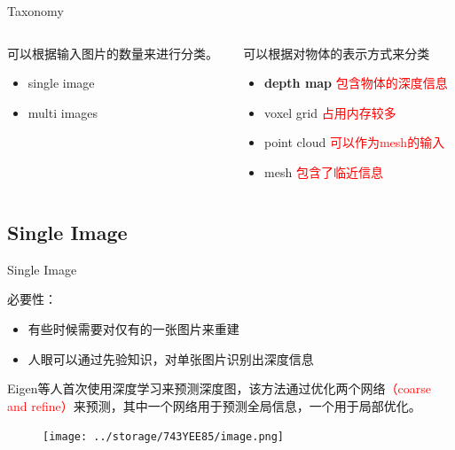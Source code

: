 \documentclass[dark]{sintefbeamer}
\begin{document}
\begin{frame}[fragile]{Taxonomy}
  \begin{columns}
    \begin{column}{0.5\textwidth}
      可以根据输入图片的数量来进行分类。
      \begin{itemize}
        \item single image
        \item multi images
      \end{itemize}
  
    \end{column}
    \begin{column}{0.5\textwidth}
      可以根据对物体的表示方式来分类
      \begin{itemize}
        \item \textbf{depth map} \quad \textcolor{red}{包含物体的深度信息}
        \item voxel grid \quad \textcolor{red}{占用内存较多}
        \item point cloud \quad \textcolor{red}{可以作为mesh的输入}
        \item mesh \quad \textcolor{red}{包含了临近信息}
      \end{itemize}
    \end{column}
  \end{columns}
\end{frame}


\subsection{Single Image}


\begin{frame}[t, fragile]{Single Image}
  
  必要性：
  \begin{itemize}
    \item 有些时候需要对仅有的一张图片来重建
    \item 人眼可以通过先验知识，对单张图片识别出深度信息
  \end{itemize}

  Eigen\cite{eigenDepthMapPrediction}等人首次使用深度学习来预测深度图，该方法通过优化两个网络\textcolor{red}{（coarse and refine）}来预测，其中一个网络用于预测全局信息，一个用于局部优化。

  \begin{figure}
    \texttt{[image: ../storage/743YEE85/image.png]}
  \end{figure}

\end{frame}
\end{document}
